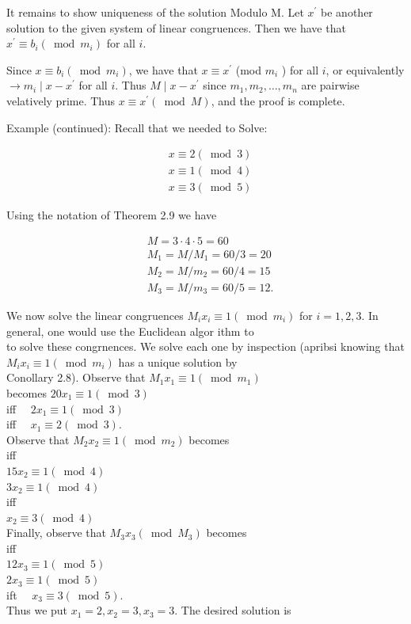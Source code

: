 \documentclass[10pt]{article}
\begin{document}
It remains to show uniqueness of the solution Modulo M. Let $x^{\prime}$ be another solution to the given system of linear congruences. Then we have that $x^{\prime} \equiv b_{i}\left(\bmod m_{i}\right)$ for all $i$.

Since $x \equiv b_{i}\left(\bmod m_{i}\right)$, we have that $x \equiv x^{\prime}$ (mod $m_{i}$ ) for all $i$, or equivalently $\rightarrow m_{i} \mid x-x^{\prime}$ for all $i$. Thus $M \mid x-x^{\prime}$ since $m_{1}, m_{2}, \ldots, m_{n}$ are pairwise velatively prime. Thus $x \equiv x^{\prime}(\bmod M)$, and the proof is complete.

Example (continued): Recall that we needed to Solve:

$$
\begin{aligned}
& x \equiv 2(\bmod 3) \\
& x \equiv 1(\bmod 4) \\
& x \equiv 3(\bmod 5)
\end{aligned}
$$

Using the notation of Theorem 2.9 we have

$$
\begin{aligned}
& M=3 \cdot 4 \cdot 5=60 \\
& M_{1}=M / M_{1}=60 / 3=20 \\
& M_{2}=M / m_{2}=60 / 4=15 \\
& M_{3}=M / m_{3}=60 / 5=12 .
\end{aligned}
$$

We now solve the linear congruences $M_{i} x_{i} \equiv 1\left(\bmod m_{i}\right)$ for $i=1,2,3$. In general, one would use the Euclidean algor ithm to\\
to solve these congrnences. We solve each one by inspection (apribsi knowing that\\
$M_{i} x_{i} \equiv 1\left(\bmod m_{i}\right)$ has a unique solution by\\
Conollary 2.8). Observe that $M_{1} x_{1} \equiv 1\left(\bmod m_{1}\right)$\\
becomes $20 x_{1} \equiv 1(\bmod 3)$\\
iff $\quad 2 x_{1} \equiv 1(\bmod 3)$\\
iff $\quad x_{1} \equiv 2(\bmod 3)$.\\
Observe that $M_{2} x_{2} \equiv 1\left(\bmod m_{2}\right)$ becomes\\
iff\\
$15 x_{2} \equiv 1(\bmod 4)$\\
$3 x_{2} \equiv 1(\bmod 4)$\\
iff\\
$x_{2} \equiv 3(\bmod 4)$\\
Finally, observe that $M_{3} x_{3}\left(\bmod M_{3}\right)$ becomes\\
iff\\
$12 x_{3} \equiv 1(\bmod 5)$\\
$2 x_{3} \equiv 1(\bmod 5)$\\
ift $\quad x_{3} \equiv 3(\bmod 5)$.\\
Thus we put $x_{1}=2, x_{2}=3, x_{3}=3$. The desired solution is
\end{document}
